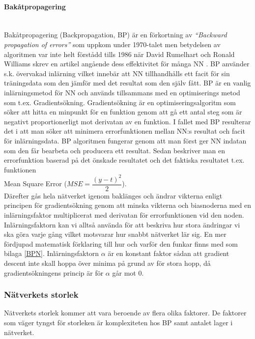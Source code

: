 \documentclass[a4paper,10pt]{article}
\begin{document}
\paragraph{Bakåtpropagering}\hspace{0pt}\\
Bakåtpropagering (Backpropagation, BP) är en förkortning av \emph{``Backward propagation of errors''} \autocite{BP} som uppkom under 1970-talet men betydelsen av algoritmen var inte helt förstådd tills 1986 när David Rumelhart och Ronald Williams skrev en artikel angående dess effektivitet för många NN \autocite{NNDL}. BP använder s.k. övervakad inlärning vilket innebär att NN tillhandhålls ett facit för sin träningsdata som den jämför med det resultat som den själv fått. BP är en vanlig inlärningsmetod för NN och används tillsammans med en optimiserings metod som t.ex. Gradientsökning. Gradientsökning är en optimiseringsalgoritm som söker att hitta en minpunkt för en funktion genom att gå ett antal steg som är negativt proportionerligt mot derivatan av en funktion\autocite{GD}. I fallet med BP resulterar det i att man söker att minimera errorfunktionen mellan NN:s resultat och facit för inlärningsdata. 
BP algoritmen fungerar genom att man först ger NN indatan som den får bearbeta och producera ett resultat. Sedan beskriver man en errorfunktion baserad på det önskade resultatet och det faktiska resultatet t.ex. funktionen \\Mean Square Error ($MSE = \dfrac{(y-t)^2}{2}$). \\Därefter gås hela nätverket igenom baklänges och ändrar vikterna enligt principen för gradientsökning genom att minska vikterna och biasnoderna med en inlärningsfaktor multiplicerat med derivatan för errorfunktionen vid den noden. Inlärningsfaktorn kan vi alltså använda för att beskriva hur stora ändringar vi ska göra varje gång vilket motsvarar hur snabbt nätverket lär sig. En mer fördjupad matematisk förklaring till hur och varför den funkar finns med som bilaga \ref{BPN}. Inlärningsfaktorn $\alpha$ är en konstant faktor sådan att gradient descent inte skall hoppa över minima på grund av för stora hopp, då gradientsökningens princip är för $\alpha$ går mot 0.


\subsubsection{Nätverkets storlek}
Nätverkets storlek kommer att vara beroende av flera olika faktorer. De faktorer som väger tyngst för storleken är komplexiteten hos BP samt antalet lager i nätverket.
\end{document}
